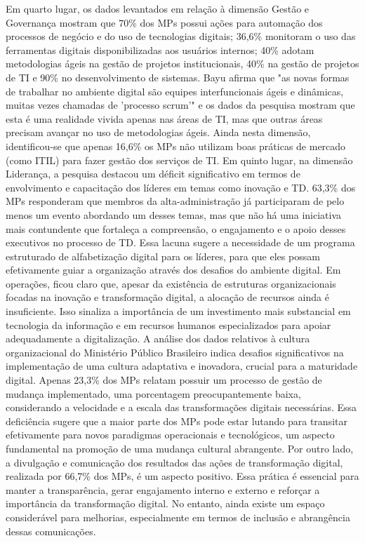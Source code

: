 Em quarto lugar, os dados levantados em relação à dimensão Gestão e Governança mostram que 70\% dos MPs possui ações para automação dos processos de negócio e do uso de tecnologias digitais; 36,6\% monitoram o uso das ferramentas digitais disponibilizadas aos usuários internos; 40\% adotam metodologias ágeis na gestão de projetos institucionais, 40\% na gestão de projetos de TI e 90\% no desenvolvimento de sistemas. Bayu afirma que "as novas formas de trabalhar no ambiente digital são equipes interfuncionais ágeis e dinâmicas, muitas vezes chamadas de 'processo scrum'" e os dados da pesquisa mostram que esta é uma realidade vivida apenas nas áreas de TI, mas que outras áreas precisam avançar no uso de metodologias ágeis. Ainda nesta dimensão, identificou-se que apenas 16,6\% os MPs não utilizam boas práticas de mercado (como ITIL) para fazer gestão dos serviços de TI.
Em quinto lugar, na dimensão Liderança, a pesquisa destacou um déficit significativo em termos de envolvimento e capacitação dos líderes em temas como inovação e TD. 63,3\% dos MPs responderam que membros da alta-administração já participaram de pelo menos um evento abordando um desses temas, mas que não há uma iniciativa mais contundente que fortaleça a compreensão, o engajamento e o apoio desses executivos no processo de TD. Essa lacuna sugere a necessidade de um programa estruturado de alfabetização digital para os líderes, para que eles possam efetivamente guiar a organização através dos desafios do ambiente digital.
Em operações, ficou claro que, apesar da existência de estruturas organizacionais focadas na inovação e transformação digital, a alocação de recursos ainda é insuficiente. Isso sinaliza a importância de um investimento mais substancial em tecnologia da informação e em recursos humanos especializados para apoiar adequadamente a digitalização.
A análise dos dados relativos à cultura organizacional do Ministério Público Brasileiro indica desafios significativos na implementação de uma cultura adaptativa e inovadora, crucial para a maturidade digital. Apenas 23,3\% dos MPs relatam possuir um processo de gestão de mudança implementado, uma porcentagem preocupantemente baixa, considerando a velocidade e a escala das transformações digitais necessárias. Essa deficiência sugere que a maior parte dos MPs pode estar lutando para transitar efetivamente para novos paradigmas operacionais e tecnológicos, um aspecto fundamental na promoção de uma mudança cultural abrangente.
Por outro lado, a divulgação e comunicação dos resultados das ações de transformação digital, realizada por 66,7\% dos MPs, é um aspecto positivo. Essa prática é essencial para manter a transparência, gerar engajamento interno e externo e reforçar a importância da transformação digital. No entanto, ainda existe um espaço considerável para melhorias, especialmente em termos de inclusão e abrangência dessas comunicações.
